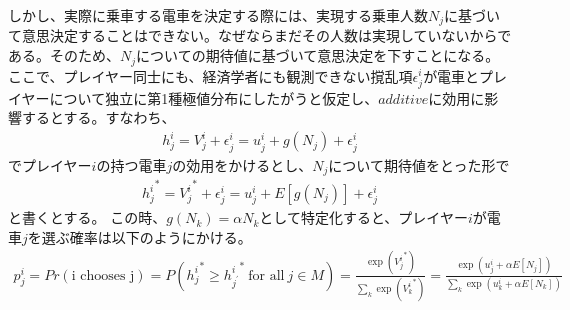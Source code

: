 \documentclass{jsarticle}
\begin{document}
しかし、実際に乗車する電車を決定する際には、実現する乗車人数$N_j$に基づいて意思決定することはできない。なぜならまだその人数は実現していないからである。そのため、$N_j$についての期待値に基づいて意思決定を下すことになる。ここで、プレイヤー同士にも、経済学者にも観測できない撹乱項$\epsilon_j^i$が電車とプレイヤーについて独立に第1種極値分布にしたがうと仮定し、$additive$に効用に影響するとする。すなわち、
\begin{align*}
	h_j^i = V_j^i + \epsilon_j^i = u_j^i + g(N_j) + \epsilon_j^i
\end{align*}
でプレイヤー$i$の持つ電車$j$の効用をかけるとし、$N_j$について期待値をとった形で
\begin{align*}
	{h_j^i}^* = {V_j^i}^* + \epsilon_j^i = u_j^i + E[g(N_j)] + \epsilon_j^i
\end{align*}
と書くとする。
この時、$g(N_k) = \alpha N_k$として特定化すると、プレイヤー$i$が電車$j$を選ぶ確率は以下のようにかける。
\begin{align*}
	p_j^i = Pr(\text{i chooses j}) = P({h_j^i}^* \geq {h_{j^{'}}^i}^*\ \text{for all}\ j \in M) = \frac{\exp({V_j^i}^*)}{\sum_k \exp({V_k^i}^*)} = \frac{\exp(u_j^i + \alpha E[N_j])}{\sum_k \exp(u_k^i + \alpha E[N_k])}
\end{align*}
\end{document}
